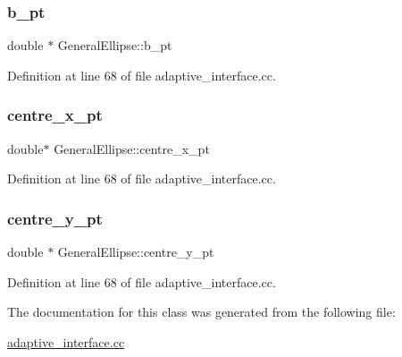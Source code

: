 \subsubsection{\texorpdfstring{b\+\_\+pt}{b\_pt}}
{\footnotesize\ttfamily double $\ast$ General\+Ellipse\+::b\+\_\+pt\hspace{0.3cm}{\ttfamily [private]}}



Definition at line 68 of file adaptive\+\_\+interface.\+cc.

\mbox{\label{classGeneralEllipse_a94a4648c20c4a51e2e9599634e32f9f1}} 
\subsubsection{\texorpdfstring{centre\+\_\+x\+\_\+pt}{centre\_x\_pt}}
{\footnotesize\ttfamily double$\ast$ General\+Ellipse\+::centre\+\_\+x\+\_\+pt\hspace{0.3cm}{\ttfamily [private]}}



Definition at line 68 of file adaptive\+\_\+interface.\+cc.

\mbox{\label{classGeneralEllipse_a64b87c57aa9b725a9099fb64aa2586dd}} 
\subsubsection{\texorpdfstring{centre\+\_\+y\+\_\+pt}{centre\_y\_pt}}
{\footnotesize\ttfamily double $\ast$ General\+Ellipse\+::centre\+\_\+y\+\_\+pt\hspace{0.3cm}{\ttfamily [private]}}



Definition at line 68 of file adaptive\+\_\+interface.\+cc.



The documentation for this class was generated from the following file\+:\begin{DoxyCompactItemize}
\item 
\hyperlink{adaptive__interface_8cc}{adaptive\+\_\+interface.\+cc}\end{DoxyCompactItemize}
